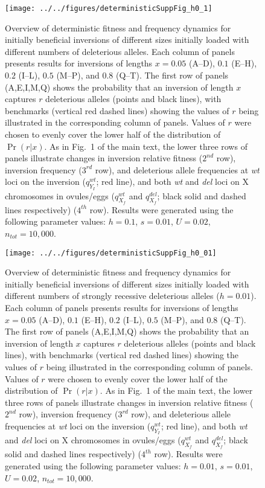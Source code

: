 \documentclass{article}
\begin{document}
\begin{appendices}
 \begin{figure}[htbp]
 \centering
 \texttt{[image: ../../figures/deterministicSuppFig\_h0\_1]}
 \caption{Overview of deterministic fitness and frequency dynamics for initially beneficial inversions of different sizes initially loaded with different numbers of deleterious alleles. Each column of panels presents results for inversions of lengths $x = 0.05$ (A--D), $0.1$ (E--H), $0.2$ (I--L), $0.5$ (M--P), and $0.8$ (Q--T). The first row of panels (A,E,I,M,Q) shows the probability that an inversion of length $x$ captures $r$ deleterious alleles (points and black lines), with benchmarks (vertical red dashed lines) showing the values of $r$ being illustrated in the corresponding column of panels. Values of $r$ were chosen to evenly cover the lower half of the distribution of $\Pr(r | x)$. As in Fig.~1 of the main text, the lower three rows of panels illustrate changes in inversion relative fitness ($2^{nd}$ row), inversion frequency ($3^{rd}$ row), and deleterious allele frequencies at {\itshape wt} loci on the inversion ($q_{Y_I}^{wt}$; red line), and both {\itshape wt} and {\itshape del} loci on X chromosomes in ovules/eggs ($q_{X_f}^{wt}$ and $q_{X_f}^{del}$; black solid and dashed lines respectively) ($4^{th}$ row). Results were generated using the following parameter values: $h = 0.1$, $s = 0.01$, $U = 0.02$, $n_{tot} = 10,000$.}
 \label{fig:DetermDynamics_h0.1}
 \end{figure}



 \begin{figure}[htbp]
 \centering
 \texttt{[image: ../../figures/deterministicSuppFig\_h0\_01]}
 \caption{Overview of deterministic fitness and frequency dynamics for initially beneficial inversions of different sizes initially loaded with different numbers of strongly recessive deleterious alleles ($h = 0.01$). Each column of panels presents results for inversions of lengths $x = 0.05$ (A--D), $0.1$ (E--H), $0.2$ (I--L), $0.5$ (M--P), and $0.8$ (Q--T). The first row of panels (A,E,I,M,Q) shows the probability that an inversion of length $x$ captures $r$ deleterious alleles (points and black lines), with benchmarks (vertical red dashed lines) showing the values of $r$ being illustrated in the corresponding column of panels. Values of $r$ were chosen to evenly cover the lower half of the distribution of $\Pr(r | x)$. As in Fig.~1 of the main text, the lower three rows of panels illustrate changes in inversion relative fitness ($2^{nd}$ row), inversion frequency ($3^{rd}$ row), and deleterious allele frequencies at {\itshape wt} loci on the inversion ($q_{Y_I}^{wt}$; red line), and both {\itshape wt} and {\itshape del} loci on X chromosomes in ovules/eggs ($q_{X_f}^{wt}$ and $q_{X_f}^{del}$; black solid and dashed lines respectively) ($4^{th}$ row). Results were generated using the following parameter values: $h = 0.01$, $s = 0.01$, $U = 0.02$, $n_{tot} = 10,000$.}
 \label{fig:DetermDynamics_h0.01}
 \end{figure}




\end{appendices}
\end{document}
